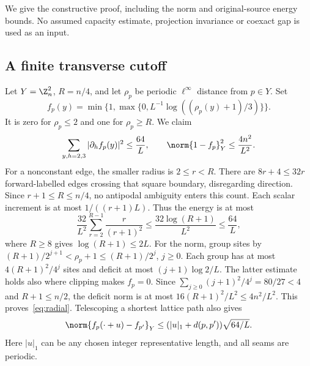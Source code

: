 We give the constructive proof, including the norm and original-source
energy bounds. No assumed capacity estimate, projection invariance or
coexact gap is used as an input.

\subsection{A finite transverse cutoff}
Let $Y=\Z_n^2$, $R=n/4$, and let $\rho_p$ be periodic $\ell^\infty$
distance from $p\in Y$. Set
\[
 f_p(y)=\min\{1,\max\{0,L^{-1}\log((\rho_p(y)+1)/3)\}\}.
\]
It is zero for $\rho_p\leq2$ and one for $\rho_p\geq R$. We claim
\begin{equation}\label{eq:radial}
 \sum_{y,h=2,3}|\partial_h f_p(y)|^2\leq\frac{64}{L},
 \qquad \norm{1-f_p}_Y^2\leq\frac{4n^2}{L^2}.
\end{equation}
For a nonconstant edge, the smaller radius is $2\leq r<R$. There are
$8r+4\leq32r$ forward-labelled edges crossing that square boundary,
disregarding direction. Since $r+1\leq R\leq n/4$, no antipodal ambiguity
enters this count. Each scalar increment is at most $1/((r+1)L)$.
Thus the energy is at most
\[
 \frac{32}{L^2}\sum_{r=2}^{R-1}\frac{r}{(r+1)^2}
 \leq\frac{32\log(R+1)}{L^2}\leq\frac{64}{L},
\]
where $R\geq8$ gives $\log(R+1)\leq2L$.
For the norm, group sites by
$(R+1)/2^{j+1}<\rho_p+1\leq(R+1)/2^j$, $j\geq0$.
Each group has at most $4(R+1)^2/4^j$ sites and deficit at most
$(j+1)\log2/L$. The latter estimate holds also where clipping makes
$f_p=0$. Since $\sum_{j\geq0}(j+1)^2/4^j=80/27<4$ and $R+1\leq n/2$,
the deficit norm is at most $16(R+1)^2/L^2\leq4n^2/L^2$.
This proves~\eqref{eq:radial}. Telescoping a shortest lattice path also gives
\begin{equation}\label{eq:singletranslation}
 \norm{f_p(\cdot+u)-f_{p'}}_Y
 \leq (|u|_1+d(p,p'))\sqrt{64/L}.
\end{equation}
Here $|u|_1$ can be any chosen integer representative length, and all seams
are periodic.


